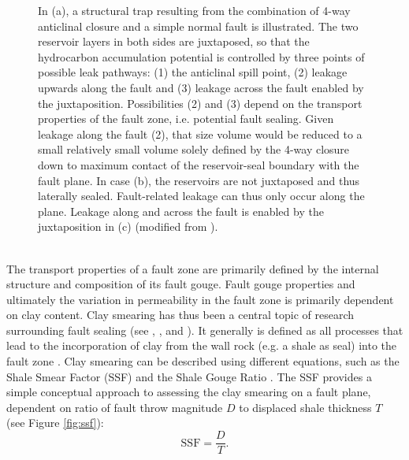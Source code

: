 \begin{figure}[h]
\begin{subfigure}{0.18\textwidth}
			\end{subfigure}
			\caption{In (a), a structural trap resulting from the combination of 4-way anticlinal closure and a simple normal fault is illustrated. The two reservoir layers in both sides are juxtaposed, so that the hydrocarbon accumulation potential is controlled by three points of possible leak pathways: (1) the anticlinal spill point, (2) leakage upwards along the fault and (3) leakage across the fault enabled by the juxtaposition. Possibilities (2) and (3) depend on the transport properties of the fault zone, i.e. potential fault sealing. Given leakage along the fault (2), that size volume would be reduced to a small relatively small volume solely defined by the 4-way closure down to maximum contact of the reservoir-seal boundary with the fault plane. In case (b), the reservoirs are not juxtaposed and thus laterally sealed. Fault-related leakage can thus only occur along the plane. Leakage along and across the fault is enabled by the juxtaposition in (c) (modified from \citet{van2003lateral}).}\label{fig:fault_trap_spills}
		\end{figure}\\
		The transport properties of a fault zone are primarily defined by the internal structure and composition of its fault gouge. Fault gouge properties and ultimately the variation in permeability in the fault zone is primarily dependent on clay content. Clay smearing has thus been a central topic of research surrounding fault sealing (see \citet{lindsay1993outcrop} \citet{yielding1997quantitative}, \citet{van2003lateral} , \citet{van2005processes} and \citet{schmatz2010clay}). It generally is defined as all processes that lead to the incorporation of clay from the wall rock (e.g. a shale as seal) into the fault zone \citep{van2003lateral, vrolijk2016clay}. Clay smearing can be described using different equations, such as the Shale Smear Factor (SSF) and the Shale Gouge Ratio \citep{lindsay1993outcrop, yielding1997quantitative, vrolijk2016clay}. The SSF provides a simple conceptual approach to assessing the clay smearing on a fault plane, dependent on ratio of fault throw magnitude $D$ to displaced shale thickness $T$ \citep{lindsay1993outcrop, yielding1997quantitative, yielding2012using} (see Figure \ref{fig:ssf}):
		\begin{equation}
			\text{SSF} = \frac{D}{T}.
		\end{equation}
